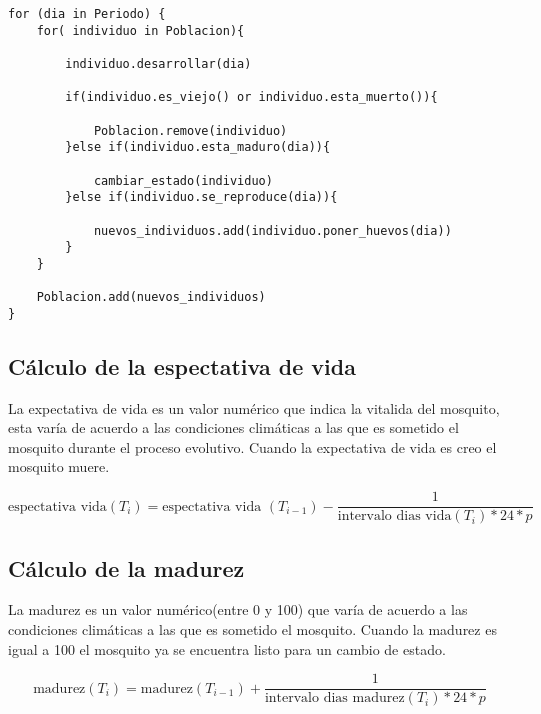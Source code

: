 \begin{lstlisting}[caption=Pseudocódigo del proceso evolutivo, label=a_label,  float=t]
for (dia in Periodo) {
    for( individuo in Poblacion){

        individuo.desarrollar(dia)

        if(individuo.es_viejo() or individuo.esta_muerto()){

            Poblacion.remove(individuo)
        }else if(individuo.esta_maduro(dia)){

            cambiar_estado(individuo)
        }else if(individuo.se_reproduce(dia)){

            nuevos_individuos.add(individuo.poner_huevos(dia))
        }
    }

    Poblacion.add(nuevos_individuos)
}
\end{lstlisting}


\subsection{Cálculo de la espectativa de vida}
La expectativa de vida es un valor numérico que indica la vitalida del
mosquito, esta varía de acuerdo a las condiciones climáticas a las que
es sometido el mosquito durante el proceso evolutivo. Cuando la expectativa
de vida es creo el mosquito muere.


\begin{equation}
\text{espectativa vida}(T_{i}) = \text{espectativa vida }(T_{i-1}) - \frac{1}{\text{intervalo dias vida}(T_{i}) * 24 * p}
\end{equation}
\subsection{Cálculo de la madurez}
La madurez es un valor numérico(entre 0 y 100) que varía de acuerdo
a las condiciones climáticas a las que es sometido el mosquito. Cuando la
madurez es igual a 100 el mosquito ya se encuentra listo para un cambio de
estado.

\begin{equation}
\text{madurez}(T_{i}) = \text{madurez}(T_{i-1}) + \frac{1}{\text{intervalo dias madurez}(T_{i}) * 24 * p}
\end{equation}

